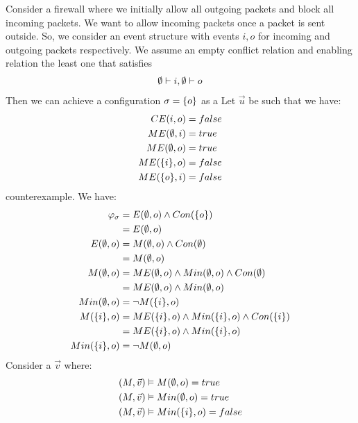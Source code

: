\documentclass{article}
\begin{document}
\begin{example}
    Consider a firewall where we initially allow all outgoing packets and block all incoming packets.
    We want to allow incoming packets once a packet is sent outside.
    So, we consider an event structure with events $i,o$ for incoming and
    outgoing packets respectively.
    We assume an empty conflict relation and enabling relation
    the least one that satisfies
    \begin{align*}
        \emptyset \vdash i, \emptyset \vdash o
    \end{align*}
    Then we can achieve a configuration $\sigma = \{o\}$ as a
    Let $\vec u$ be such that we have:
    \begin{align*}
        CE(i,o)      & = false \\
        ME(\emptyset, i)    & = true  \\
        ME(\emptyset, o)    & = true  \\
        ME(\{i\}, o) & = false \\
        ME(\{o\}, i) & = false \\
    \end{align*}
    counterexample.
    We have:
    \begin{align*}
        \varphi_{\sigma} & = E(\emptyset, o) \wedge Con(\{o\}) \\
        & = E(\emptyset, o) \\
        E(\emptyset, o)  & = M(\emptyset,o) \wedge Con(\emptyset) \\
        & = M(\emptyset,o)  \\
        M(\emptyset, o)  & = ME(\emptyset,o) \wedge Min(\emptyset, o)\wedge Con(\emptyset) \\
        & = ME(\emptyset,o) \wedge Min(\emptyset, o)                        \\
        Min(\emptyset, o)       & = \neg M(\{i\},o)                                   \\
        M(\{i\},o)       & = ME(\{i\},o) \wedge Min(\{i\},o) \wedge Con(\{i\}) \\
                         & = ME(\{i\},o) \wedge Min(\{i\},o)                   \\
        Min(\{i\},o)     & = \neg M(\emptyset,o)
    \end{align*}
    Consider a $\vec v$ where:
    \begin{align*}
        (M,\vec v) & \vDash M(\e, o)       = true  \\
        (M,\vec v) & \vDash Min(\e, o)     = true  \\
        (M,\vec v) & \vDash Min(\s{i}, o)  = false \\

\end{align*}
\end{example}
\end{document}
